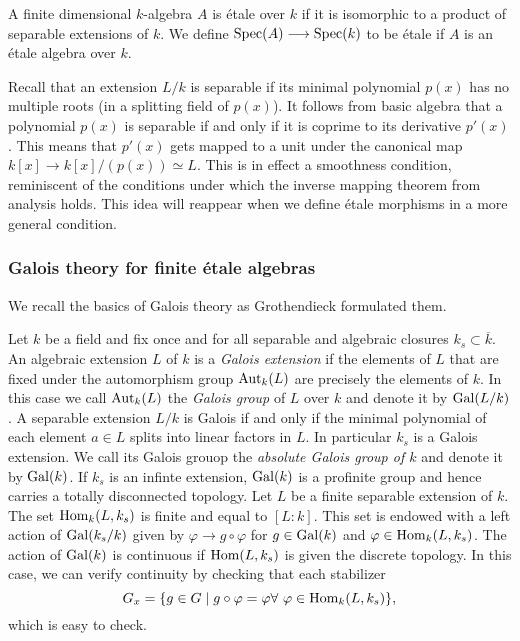 \begin{definition}
  A finite dimensional $k$-algebra $A$ is \'etale over $k$ if it is isomorphic to a product of separable extensions of $k$. We define $\operatorname{Spec}(A) \longrightarrow \operatorname{Spec}(k)$ to be \'etale if $A$ is an \'etale algebra over $k$.
\end{definition}

Recall that an extension $L/k$ is separable if its minimal polynomial $p(x)$ has no multiple roots (in a splitting field of $p(x)$). It follows from basic algebra that a polynomial $p(x)$ is separable if and only if it is coprime to its derivative $p'(x)$. This means that $p'(x)$ gets mapped to a unit under the canonical map $k[x] \to k[x]/(p(x)) \simeq L$. This is in effect a smoothness condition, reminiscent of the conditions under which the inverse mapping theorem from analysis holds. This idea will reappear when we define \'etale morphisms in a more general condition.

\subsubsection{Galois theory for finite \'etale algebras}
We recall the basics of Galois theory as Grothendieck formulated them.

\begin{construction}
  Let $k$ be a field and fix once and for all separable and algebraic closures $k_s \subset \overline{k}$.  An algebraic extension $L$ of $k$ is a \textit{Galois extension} if the elements of $L$ that are fixed under the automorphism group $\operatorname{Aut}_k(L)$ are precisely the elements of $k$. In this case we call $\operatorname{Aut}_k(L)$ the \textit{Galois group} of $L$ over $k$ and denote it by $\operatorname{Gal}(L/k)$. A separable extension $L/k$ is Galois if and only if the minimal polynomial of each element $a \in L$ splits into linear factors in $L$. In particular $k_s$ is a Galois extension. We call its Galois grouop the \textit{absolute Galois group of $k$} and denote it by $\operatorname{Gal}(k)$. If $k_s$ is an infinte extension, $\operatorname{Gal}(k)$ is a profinite group and hence carries a totally disconnected topology. Let $L$ be a finite separable extension of $k$. The set $\operatorname{Hom}_k(L, k_s)$ is finite and equal to $[L:k]$. This set is endowed with a left action of $\operatorname{Gal}(k_s/k)$ given by $\varphi \to g \circ \varphi$ for $g \in \operatorname{Gal}(k)$ and $\varphi \in \operatorname{Hom}_k(L, k_s)$. The action of $\operatorname{Gal}(k)$ is continuous if $\operatorname{Hom}(L, k_s)$ is given the discrete topology. In this case, we can verify continuity by checking that each stabilizer 
  \[G_x = \{ g \in G \mid g \circ \varphi =  \varphi \forall\ \varphi \in \operatorname{Hom}_k(L, k_s)\}, \]
  which is easy to check.
\end{construction}

